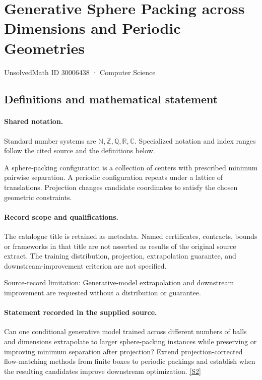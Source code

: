 \documentclass[11pt]{article}
\newcommand{\sref}[2]{\hyperlink{source:#1:#2}{[S#2]}}
\begin{document}
\setcounter{section}{30006437}
\section{Generative Sphere Packing across Dimensions and Periodic Geometries}\label{30006438}
{\small\sffamily UnsolvedMath ID 30006438 · Computer Science}
\subsection{Definitions and mathematical statement}

\paragraph{Shared notation.}Standard number systems are $\mathbb N,\mathbb Z,\mathbb Q,\mathbb R,\mathbb C$. Specialized notation and index ranges follow the cited source and the definitions below.


A sphere-packing configuration is a collection of centers with prescribed minimum pairwise separation. A periodic configuration repeats under a lattice of translations. Projection changes candidate coordinates to satisfy the chosen geometric constraints.
\paragraph{Record scope and qualifications.}
The catalogue title is retained as metadata. Named certificates, contracts, bounds or frameworks in that title are not asserted as results of the original source extract.
The training distribution, projection, extrapolation guarantee, and downstream-improvement criterion are not specified.

Source-record limitation: Generative-model extrapolation and downstream improvement are requested without a distribution or guarantee.
\paragraph{Statement recorded in the supplied source.}
Can one conditional generative model trained across different numbers of balls and dimensions extrapolate to larger sphere-packing instances while preserving or improving minimum separation after projection? Extend projection-corrected flow-matching methods from finite boxes to periodic packings and establish when the resulting candidates improve downstream optimization. \sref{30006438}{2}
\end{document}
